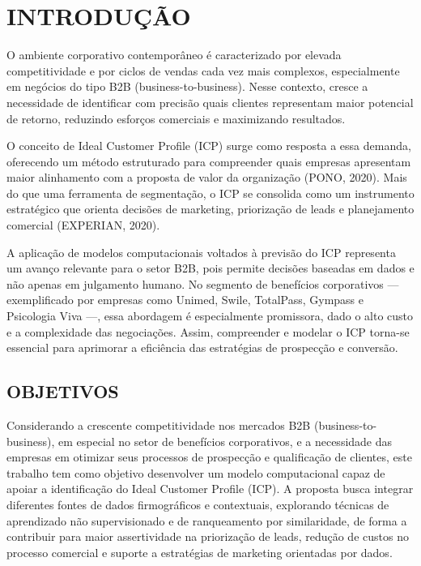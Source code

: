 \chapter{INTRODUÇÃO}

O ambiente corporativo contemporâneo é caracterizado por elevada competitividade e por ciclos de vendas cada vez mais complexos, especialmente em negócios do tipo B2B (business-to-business). Nesse contexto, cresce a necessidade de identificar com precisão quais clientes representam maior potencial de retorno, reduzindo esforços comerciais e maximizando resultados.

O conceito de Ideal Customer Profile (ICP) surge como resposta a essa demanda, oferecendo um método estruturado para compreender quais empresas apresentam maior alinhamento com a proposta de valor da organização (PONO, 2020). Mais do que uma ferramenta de segmentação, o ICP se consolida como um instrumento estratégico que orienta decisões de marketing, priorização de leads e planejamento comercial (EXPERIAN, 2020).

A aplicação de modelos computacionais voltados à previsão do ICP representa um avanço relevante para o setor B2B, pois permite decisões baseadas em dados e não apenas em julgamento humano. No segmento de benefícios corporativos — exemplificado por empresas como Unimed, Swile, TotalPass, Gympass e Psicologia Viva —, essa abordagem é especialmente promissora, dado o alto custo e a complexidade das negociações. Assim, compreender e modelar o ICP torna-se essencial para aprimorar a eficiência das estratégias de prospecção e conversão.

\section{OBJETIVOS}

Considerando a crescente competitividade nos mercados B2B (business-to-business), em especial no setor de benefícios corporativos, e a necessidade das empresas em otimizar seus processos de prospecção e qualificação de clientes, este trabalho tem como objetivo desenvolver um modelo computacional capaz de apoiar a identificação do Ideal Customer Profile (ICP). A proposta busca integrar diferentes fontes de dados firmográficos e contextuais, explorando técnicas de aprendizado não supervisionado e de ranqueamento por similaridade, de forma a contribuir para maior assertividade na priorização de leads, redução de custos no processo comercial e suporte a estratégias de marketing orientadas por dados. 

